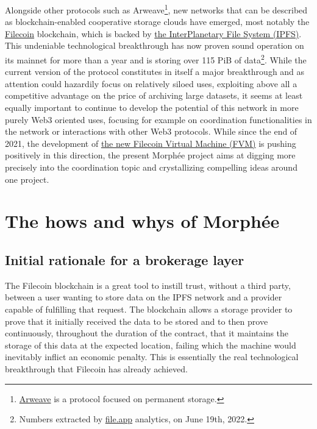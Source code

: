 \documentclass[twoside,twocolumn]{article}
\begin{document}
Alongside other protocols such as Arweave\footnote{\href{https://www.arweave.org/}{Arweave}
is a protocol focused on permanent storage.},
new networks that can be described as blockchain-enabled cooperative storage clouds have emerged,
most notably the \href{https://filecoin.io/}{Filecoin} blockchain, which is backed
by \href{https://ipfs.io/}{the InterPlanetary File System (IPFS)}.
This undeniable technological breakthrough has now proven sound operation on its mainnet for more than a year and is storing
over 115 PiB of data\footnote{Numbers extracted by \href{https://file.app/}{file.app} analytics, on June 19th, 2022.}.
While the current version of the protocol constitutes in itself a major breakthrough and as attention could hazardily focus on relatively siloed uses,
exploiting above all a competitive advantage on the price of archiving large datasets,
it seems at least equally important to continue to develop the potential of this network in more purely Web3 oriented uses,
focusing for example on coordination functionalities in the network or interactions with other Web3 protocols.
While since the end of 2021, the development of \href{https://fvm.filecoin.io/}{the new Filecoin Virtual Machine (FVM)} is pushing positively in this direction,
the present Morphée project aims at digging more precisely into the coordination topic and crystallizing compelling ideas around one project.


\section{The hows and whys of Morphée}

\subsection{Initial rationale for a brokerage layer}

The Filecoin blockchain is a great tool to instill trust, without a third party,
between a user wanting to store data on the IPFS network and a provider capable of fulfilling that request.
The blockchain allows a storage provider to prove that it initially received the data to be stored and to then prove continuously,
throughout the duration of the contract, that it maintains the storage of this data at the expected location,
failing which the machine would inevitably inflict an economic penalty.
This is essentially the real technological breakthrough that Filecoin has already achieved.
\end{document}
